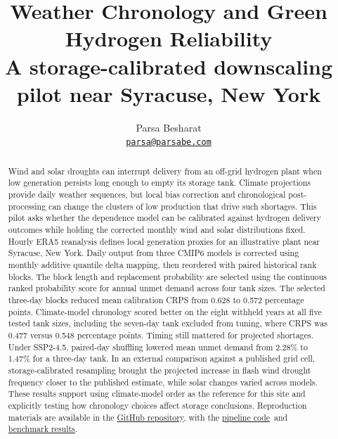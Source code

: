 \documentclass[10pt,a4paper,twocolumn]{article}
\title{\bfseries\color{Ink} Weather Chronology and Green Hydrogen Reliability\\[3pt]
  \large\normalfont A storage-calibrated downscaling pilot near Syracuse, New York}
\author{Parsa Besharat\\[-1pt]\normalsize\href{mailto:parsa@parsabe.com}{\texttt{parsa@parsabe.com}}}
\date{}
\newcommand{\RepoURL}{https://github.com/parsabe/Beyond-Normal-Weather}
\newcommand{\RepoRoot}{\href{\RepoURL}{GitHub repository}}
\newcommand{\RepoPipeline}{\href{\RepoURL/tree/hydrogen-pipeline}{pipeline code}}
\newcommand{\RepoBenchmarks}{\href{\RepoURL/tree/hydrogen-benchmarks/reports}{benchmark results}}
\begin{document}
\maketitle

\begin{abstract}
Wind and solar droughts can interrupt delivery from an off-grid hydrogen plant when low generation persists long enough to empty its storage tank. Climate projections provide daily weather sequences, but local bias correction and chronological post-processing can change the clusters of low production that drive such shortages. This pilot asks whether the dependence model can be calibrated against hydrogen delivery outcomes while holding the corrected monthly wind and solar distributions fixed. Hourly ERA5 reanalysis defines local generation proxies for an illustrative plant near Syracuse, New York. Daily output from three CMIP6 models is corrected using monthly additive quantile delta mapping, then reordered with paired historical rank blocks. The block length and replacement probability are selected using the continuous ranked probability score for annual unmet demand across four tank sizes. The selected three-day blocks reduced mean calibration CRPS from 0.628 to 0.572 percentage points. Climate-model chronology scored better on the eight withheld years at all five tested tank sizes, including the seven-day tank excluded from tuning, where CRPS was 0.477 versus 0.548 percentage points. Timing still mattered for projected shortages. Under SSP2-4.5, paired-day shuffling lowered mean unmet demand from 2.28\% to 1.47\% for a three-day tank. In an external comparison against a published grid cell, storage-calibrated resampling brought the projected increase in flash wind drought frequency closer to the published estimate, while solar changes varied across models. These results support using climate-model order as the reference for this site and explicitly testing how chronology choices affect storage conclusions. Reproduction materials are available in the \RepoRoot, with the \RepoPipeline\ and \RepoBenchmarks.
\end{abstract}
\end{document}
